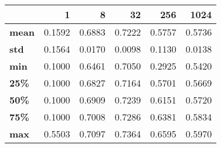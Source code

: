 \begin{tabular}{lrrrrr}
\toprule
{} &       1 &       8 &      32 &     256 &    1024 \\
\midrule
\textbf{mean} &  0.1592 &  0.6883 &  0.7222 &  0.5757 &  0.5736 \\
\textbf{std } &  0.1564 &  0.0170 &  0.0098 &  0.1130 &  0.0138 \\
\textbf{min } &  0.1000 &  0.6461 &  0.7050 &  0.2925 &  0.5420 \\
\textbf{25\% } &  0.1000 &  0.6827 &  0.7164 &  0.5701 &  0.5669 \\
\textbf{50\% } &  0.1000 &  0.6909 &  0.7239 &  0.6151 &  0.5720 \\
\textbf{75\% } &  0.1000 &  0.7008 &  0.7286 &  0.6381 &  0.5834 \\
\textbf{max } &  0.5503 &  0.7097 &  0.7364 &  0.6595 &  0.5970 \\
\bottomrule
\end{tabular}

